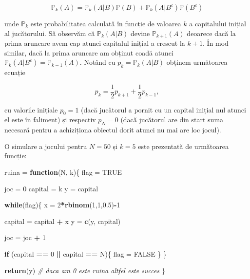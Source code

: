\documentclass[]{article}
\newenvironment{Shaded}{\begin{snugshade}}{\end{snugshade}}
\newcommand{\KeywordTok}[1]{\textcolor[rgb]{0.13,0.29,0.53}{\textbf{#1}}}
\newcommand{\DecValTok}[1]{\textcolor[rgb]{0.00,0.00,0.81}{#1}}
\newcommand{\FloatTok}[1]{\textcolor[rgb]{0.00,0.00,0.81}{#1}}
\newcommand{\StringTok}[1]{\textcolor[rgb]{0.31,0.60,0.02}{#1}}
\newcommand{\CommentTok}[1]{\textcolor[rgb]{0.56,0.35,0.01}{\textit{#1}}}
\newcommand{\OtherTok}[1]{\textcolor[rgb]{0.56,0.35,0.01}{#1}}
\newcommand{\ControlFlowTok}[1]{\textcolor[rgb]{0.13,0.29,0.53}{\textbf{#1}}}
\newcommand{\OperatorTok}[1]{\textcolor[rgb]{0.81,0.36,0.00}{\textbf{#1}}}
\newcommand{\NormalTok}[1]{#1}
\begin{document}
\[
  \mathbb{P}_k(A) = \mathbb{P}_k(A|B)\mathbb{P}(B)+\mathbb{P}_k(A|B^c)\mathbb{P}(B^c)
\]

unde \(\mathbb{P}_k\) este probabilitatea calculată în funcție de
valoarea \(k\) a capitalului inițial al jucătorului. Să observăm că
\(\mathbb{P}_k(A|B)\) devine \(\mathbb{P}_{k+1}(A)\) deoarece dacă la
prima aruncare avem cap atunci capitalul inițial a crescut la \(k+1\).
În mod similar, dacă la prima aruncare am obținut coadă atunci
\(\mathbb{P}_k(A|B^c) = \mathbb{P}_{k-1}(A)\). Notând cu
\(p_k = \mathbb{P}_k(A|B)\) obținem următoarea ecuație

\[
  p_k = \frac{1}{2}p_{k+1} + \frac{1}{2}p_{k-1},
\]

cu valorile inițiale \(p_0=1\) (dacă jucătorul a pornit cu un capital
inițial nul atunci el este în faliment) și respectiv \(p_N=0\) (dacă
jucătorul are din start suma necesară pentru a achiziționa obiectul
dorit atunci nu mai are loc jocul).

O simulare a jocului pentru \(N = 50\) și \(k = 5\) este prezentată de
următoarea funcție:

\begin{Shaded}
\begin{Highlighting}[]
\NormalTok{ruina =}\StringTok{ }\ControlFlowTok{function}\NormalTok{(N, k)\{}
\NormalTok{  flag =}\StringTok{ }\OtherTok{TRUE}

\NormalTok{  joc =}\StringTok{ }\DecValTok{0}
\NormalTok{  capital =}\StringTok{ }\NormalTok{k}
\NormalTok{  y =}\StringTok{ }\NormalTok{capital}
  
  \ControlFlowTok{while}\NormalTok{(flag)\{}
\NormalTok{    x =}\StringTok{ }\DecValTok{2}\OperatorTok{*}\KeywordTok{rbinom}\NormalTok{(}\DecValTok{1}\NormalTok{,}\DecValTok{1}\NormalTok{,}\FloatTok{0.5}\NormalTok{)}\OperatorTok{-}\DecValTok{1}
    
\NormalTok{    capital =}\StringTok{ }\NormalTok{capital }\OperatorTok{+}\StringTok{ }\NormalTok{x}
\NormalTok{    y =}\StringTok{ }\KeywordTok{c}\NormalTok{(y, capital)}
    
\NormalTok{    joc =}\StringTok{ }\NormalTok{joc }\OperatorTok{+}\StringTok{ }\DecValTok{1}
    
    \ControlFlowTok{if}\NormalTok{ (capital }\OperatorTok{==}\StringTok{ }\DecValTok{0} \OperatorTok{||}\StringTok{ }\NormalTok{capital }\OperatorTok{==}\StringTok{ }\NormalTok{N)\{}
\NormalTok{      flag =}\StringTok{ }\OtherTok{FALSE}
\NormalTok{    \}}
\NormalTok{  \}}
  
  \KeywordTok{return}\NormalTok{(y) }\CommentTok{# daca am 0 este ruina altfel este succes}
\NormalTok{\}}
\end{Highlighting}
\end{Shaded}
\end{document}
